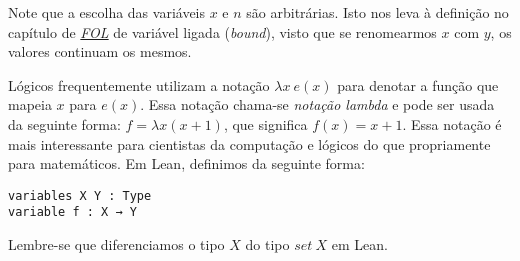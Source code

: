 Note que a escolha das variáveis $x$ e $n$ são arbitrárias.
Isto nos leva à definição no capítulo de \textit{\hyperlink{chapter.4}{FOL}} de
variável ligada (\textit{bound}), visto que se renomearmos $x$ com $y$, os valores
continuam os mesmos.

Lógicos frequentemente utilizam a notação $\lambda x ~e(x)$ para denotar a função
que mapeia $x$ para $e(x)$. Essa notação chama-se \textit{notação lambda} e pode
ser usada da seguinte forma: $f = \lambda x(x + 1)$, que significa $f(x) = x + 1$.
Essa notação é mais interessante para cientistas da computação e lógicos do que
propriamente para matemáticos. Em Lean, definimos da seguinte forma:

\begin{lstlisting}
variables X Y : Type
variable f : X → Y
\end{lstlisting}

Lembre-se que diferenciamos o tipo $X$ do tipo $set~X$ em Lean.